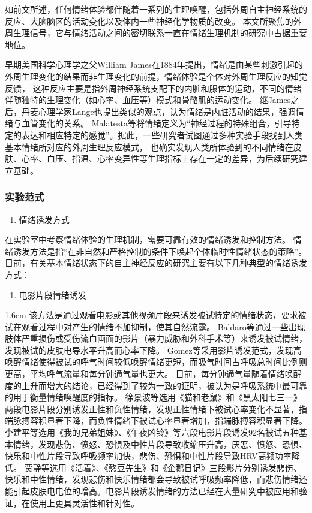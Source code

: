 如前文所述，任何情绪体验都伴随着一系列的生理唤醒，包括外周自主神经系统的反应、大脑脑区的活动变化以及体内一些神经化学物质的改变。
本文所聚焦的外周生理信号，它与情绪活动之间的密切联系一直在情绪生理机制的研究中占据重要地位。

早期美国科学心理学之父William James\cite{James1884}在1884年提出，情绪是由某些刺激引起的外周生理变化的结果而非生理变化的前提，情绪体验是个体对外周生理反应的知觉反馈，
这种反应主要是指外周神经系统支配下的内脏和腺体的运动，不同的情绪伴随独特的生理变化（如心率、血压等）模式和骨骼肌的运动变化。
继James之后，丹麦心理学家Lange也提出类似的观点，认为情绪是内脏活动的结果，强调情绪与血管变化的关系。
Malatesta等\cite{Malatesta1987}将情绪定义为“神经过程的特殊组合，引导特定的表达和相应特定的感觉”。据此，一些研究者试图通过多种实验手段找到人类基本情绪所对应的外周生理反应模式，
也确实发现人类所体验到的不同情绪在皮肤、心率、血压、指温、心率变异性等生理指标上存在一定的差异\cite{Kreibig2010}，为后续研究建立基础。

\subsubsection{实验范式}

\begin{enumerate}[\hspace{1.2em}1.]    
    \item 情绪诱发方式
\end{enumerate}

在实验室中考察情绪体验的生理机制，需要可靠有效的情绪诱发和控制方法。
情绪诱发方法是指“在非自然和严格控制的条件下唤起个体临时性情绪状态的策略”\cite{Banos2006}。
目前，有关基本情绪状态下的自主神经反应的研究主要有以下几种典型的情绪诱发方式：

\begin{enumerate}[\qquad(1)]
    \item 电影片段情绪诱发
\end{enumerate}
    
\hangindent 1.6em
该方法是通过观看电影或其他视频片段来诱发被试特定的情绪状态，要求被试在观看过程中对产生的情绪不加抑制，使其自然流露。
Baldaro等\cite{Baldaro2002}通过一些出现肢体严重损伤或受伤流血画面的影片（暴力威胁和外科手术等）来诱发被试情绪，发现被试的皮肤电导水平升高而心率下降。
Gomez等\cite{Gomez2005}采用影片诱发范式，发现高唤醒情绪使得被试的呼气时间较低唤醒情绪更短，而吸气时间占呼吸总时间比例则更高，平均呼气流量和每分钟通气量也更大。
目前，每分钟通气量随着情绪唤醒度的上升而增大的结论，已经得到了较为一致的证明，被认为是呼吸系统中最可靠的用于衡量情绪唤醒度的指标。
徐景波等\cite{XuJingbo1995}选用《猫和老鼠》和《黑太阳七三一》两段电影片段分别诱发正性和负性情绪，发现正性情绪下被试心率变化不显著，指端脉搏容积显著下降，而负性情绪下被试心率显著增加，指端脉搏容积显著下降。
李建平等\cite{LiJianping2006}选用《我的兄弟姐妹》、《午夜凶铃》等六段电影片段诱发92名被试五种基本情绪，发现悲伤、愤怒、恐惧及中性片段导致收缩压升高，厌恶、愤怒、恐惧、快乐和中性片段导致呼吸频率加快，悲伤、恐惧和中性片段导致HRV高频功率降低。
贾静等\cite{JiaJing2008}选用《活着》、《憨豆先生》和《企鹅日记》三段影片分别诱发悲伤、快乐和中性情绪，发现悲伤和快乐情绪都会导致被试呼吸频率降低，而悲伤情绪还能引起皮肤电电位的增高。电影片段诱发情绪的方法已经在大量研究中被应用和验证，在使用上更具灵活性和针对性。

